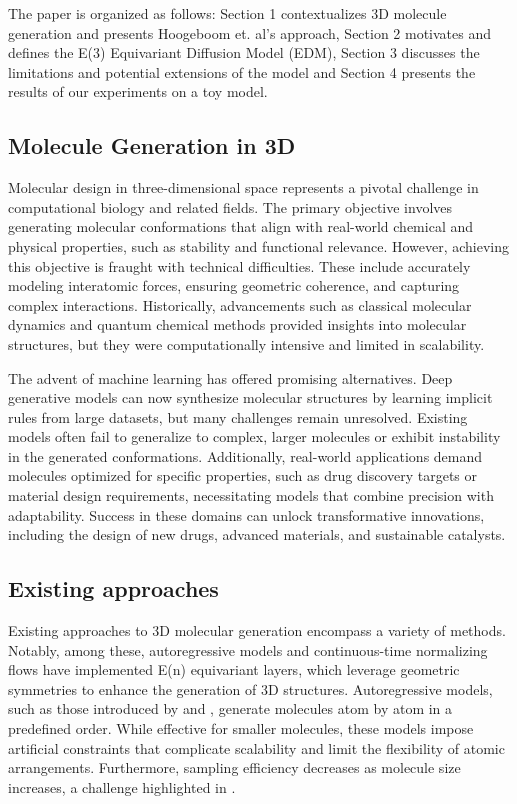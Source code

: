 \documentclass[sigconf]{acmart}
\begin{document}
The paper is organized as follows: Section 1 contextualizes 3D molecule generation and presents Hoogeboom et. al's approach, Section 2 motivates and defines the E(3) Equivariant Diffusion Model (EDM), Section 3 discusses the limitations and potential extensions of the model and Section 4 presents the results of our experiments on a toy model.

\subsection{Molecule Generation in 3D}
Molecular design in three-dimensional space represents a pivotal challenge in computational biology and related fields. The primary objective involves generating molecular conformations that align with real-world chemical and physical properties, such as stability and functional relevance. However, achieving this objective is fraught with technical difficulties. These include accurately modeling interatomic forces, ensuring geometric coherence, and capturing complex interactions. Historically, advancements such as classical molecular dynamics and quantum chemical methods provided insights into molecular structures, but they were computationally intensive and limited in scalability.

The advent of machine learning has offered promising alternatives. Deep generative models can now synthesize molecular structures by learning implicit rules from large datasets, but many challenges remain unresolved. Existing models often fail to generalize to complex, larger molecules or exhibit instability in the generated conformations. Additionally, real-world applications demand molecules optimized for specific properties, such as drug discovery targets or material design requirements, necessitating models that combine precision with adaptability. Success in these domains can unlock transformative innovations, including the design of new drugs, advanced materials, and sustainable catalysts.

\subsection{Existing approaches}
Existing approaches to 3D molecular generation encompass a variety of methods. Notably, among these, autoregressive models and continuous-time normalizing flows have implemented E(n) equivariant layers, which leverage geometric symmetries to enhance the generation of 3D structures. Autoregressive models, such as those introduced by \cite{gebauer2018generating} and \cite{gebauer2019symmetry}, generate molecules atom by atom in a predefined order. While effective for smaller molecules, these models impose artificial constraints that complicate scalability and limit the flexibility of atomic arrangements. Furthermore, sampling efficiency decreases as molecule size increases, a challenge highlighted in \cite{xu2021anytime}.
\end{document}
